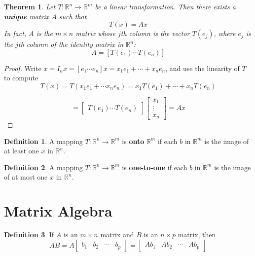 \documentclass[letterpaper]{article}
\newtheorem{theorem}{Theorem}
\theoremstyle{definition}
\newtheorem{definition}{Definition}[section]
\begin{document}
\begin{theorem}
Let $T: \mathbb{R}^n \rightarrow \mathbb{R}^m$ be a linear transformation. Then there exists a \textbf{unique} matrix $A$ such that 
$$ T(x) = Ax $$
In fact, $A$ is the $m \times n$ matrix whose $j$th column is the vector $T(e_j)$, where $e_j$ is the $j$th column of the identity matrix in $\mathbb{R}^n$: 
$$A = [T(e_1) \cdots T(e_n)]$$
\end{theorem}

\begin{proof}
Write $x = I_n x = [e_1 \cdots e_n]x = x_1 e_1 + \cdots + x_n e_n$, and use the linearity of $T$ to compute 
$$T(x) = T(x_1 e_1 + \cdots x_n e_n) = x_1 T(e_1) + \cdots + x_n T(e_n)$$ 

$$= \begin{bmatrix}
T(e_1) \cdots T(e_n)
\end{bmatrix} 
\begin{bmatrix}
x_1 \\
\vdots \\
x_n
\end{bmatrix} 
= Ax
$$ 
\end{proof}

\begin{definition}
A mapping $T: \mathbb{R}^n \rightarrow \mathbb{R}^m$ is \textbf{onto} $\mathbb{R}^m$ if each $b$ in $\mathbb{R}^m$ is the image of at least one $x$ in $\mathbb{R}^n$. 
\end{definition}

\begin{definition}
A mapping $T: \mathbb{R}^n \rightarrow \mathbb{R}^m$ is \textbf{one-to-one} if each $b$ in $\mathbb{R}^m$ is the image of at most one $x$ in $\mathbb{R}^n$. 
\end{definition}

\section{Matrix Algebra} 
\begin{definition}
If $A$ is an $m \times n$ matrix and $B$ is an $n \times p$ matrix, then 
$$AB = A
\begin{bmatrix}
b_1 & b_2 & \cdots & b_p
\end{bmatrix}
= \begin{bmatrix}
Ab_1 & Ab_2 & \cdots & Ab_p
\end{bmatrix}$$
\end{definition}
\end{document}

